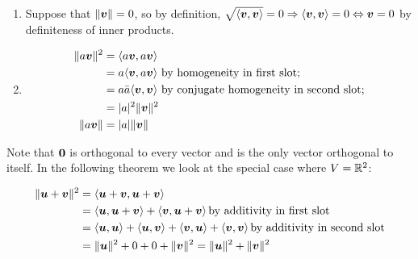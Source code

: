 \documentclass{report}
\begin{document}
	\begin{myproof} 
		\begin{enumerate}
			\item Suppose that $\|\boldsymbol{v}\|=0$, so by definition, $\sqrt{\langle\boldsymbol{v},\boldsymbol{v}\rangle}=0\Rightarrow \langle\boldsymbol{v},\boldsymbol{v}\rangle=0 \Leftrightarrow \boldsymbol{v}=0$ by definiteness of inner products.
			\item \begin{align*}
				\|a\boldsymbol{v}\|^2&=\langle a\boldsymbol{v},a\boldsymbol{v}\rangle \\
				&=a\langle\boldsymbol{v},a\boldsymbol{v}\rangle \text{ by homogeneity in first slot;}\\
				&=a\bar{a}\langle\boldsymbol{v},\boldsymbol{v}\rangle \text{ by conjugate homogeneity in second slot;}\\
				&=|a|^2\|\boldsymbol{v}\|^2\\
				\|a\boldsymbol{v}\|&=|a|\|\boldsymbol{v}\|
			\end{align*}
		\end{enumerate}
	\end{myproof}
	\vspace{1mm}
	\vspace{1mm}
	Note that $\textbf{0}$ is orthogonal to every vector and is the only vector orthogonal to itself. In the following theorem we look at the special case where $V=\RR^2$:
	\begin{myproof}
		\begin{align*}
			\|\boldsymbol{u}+\boldsymbol{v}\|^2&=\langle\boldsymbol{u}+\boldsymbol{v},\boldsymbol{u}+\boldsymbol{v}\rangle\\
			&=\langle\boldsymbol{u},\boldsymbol{u}+\boldsymbol{v}\rangle+\langle\boldsymbol{v},\boldsymbol{u}+\boldsymbol{v}\rangle\,\text{by additivity in first slot}\\
			&=\langle\boldsymbol{u},\boldsymbol{u}\rangle + \langle\boldsymbol{u},\boldsymbol{v}\rangle + \langle\boldsymbol{v},\boldsymbol{u}\rangle + \langle\boldsymbol{v},\boldsymbol{v}\rangle\,\text{by additivity in second slot}\\
			&=\|\boldsymbol{u}\|^2+0+0+\|\boldsymbol{v}\|^2=\|\boldsymbol{u}\|^2+\|\boldsymbol{v}\|^2
		\end{align*}
	\end{myproof}
	
\end{document}
